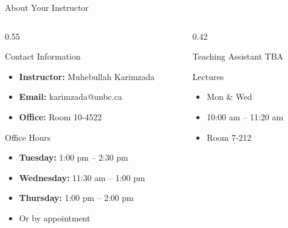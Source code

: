 \documentclass[aspectratio=169]{beamer}
\begin{document}
\begin{frame}{About Your Instructor}
\transfade
\begin{columns}
  \begin{column}{0.55\textwidth}
    \begin{block}{Contact Information}
      \begin{itemize}
        \item \textbf{Instructor:} Muhebullah Karimzada
        \item \textbf{Email:} karimzada@unbc.ca
        \item \textbf{Office:} Room 10-4522
      \end{itemize}
    \end{block}
    \vspace{0.4em}
    \begin{block}{Office Hours}
      \begin{itemize}
        \item \textbf{Tuesday:} 1:00 pm -- 2:30 pm
        \item \textbf{Wednesday:} 11:30 am -- 1:00 pm
        \item \textbf{Thursday:} 1:00 pm -- 2:00 pm
        \item Or by appointment
      \end{itemize}
    \end{block}
  \end{column}
  \begin{column}{0.42\textwidth}
    \begin{alertblock}{Teaching Assistant}
      \centering TBA
    \end{alertblock}
    \vspace{0.4em}
    \begin{block}{Lectures}
      \begin{itemize}
        \item Mon \& Wed
        \item 10:00 am -- 11:20 am
        \item Room 7-212
      \end{itemize}
    \end{block}
  \end{column}
\end{columns}
\end{frame}
\end{document}
